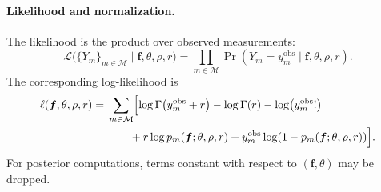 \paragraph{Likelihood and normalization.}
The likelihood is the product over observed measurements:
\[
\mathcal{L}\bigl(\{Y_m\}_{m\in\mathcal{M}}\mid \bm f,\theta,\rho,r\bigr)
=
\prod_{m\in\mathcal{M}}
\Pr\!\left(Y_m=y_m^{\mathrm{obs}} \mid \bm f,\theta,\rho,r\right).
\]
The corresponding log-likelihood is
\[
\begin{aligned}
\ell(\bm f,\theta,\rho,r)
={}&
\sum_{m\in\mathcal{M}}
\Bigl[
\log\Gamma\!\left(y_m^{\mathrm{obs}}+r\right)
-\log\Gamma(r)
-\log\!\left(y_m^{\mathrm{obs}}!\right) \\
&\qquad
+r\log p_m(\bm f;\theta,\rho,r)
+y_m^{\mathrm{obs}}\log\!\left(1-p_m(\bm f;\theta,\rho,r)\right)
\Bigr].
\end{aligned}
\]
For posterior computations, terms constant with respect to $(\bm f,\theta)$ may be dropped.


